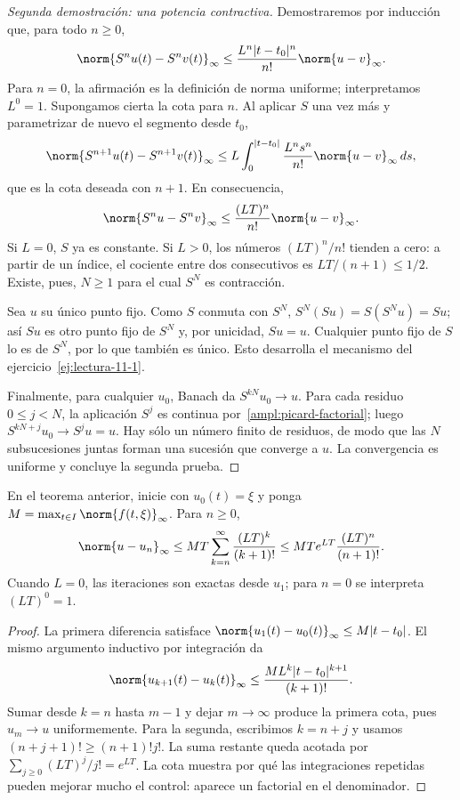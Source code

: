 \begin{proof}[Segunda demostración: una potencia contractiva]
Demostraremos por inducción que, para todo $n\ge0$,
\begin{equation}\label{ampl:picard-factorial}
 \norm{S^nu(t)-S^nv(t)}_\infty
 \le\frac{L^n|t-t_0|^n}{n!}\norm{u-v}_\infty.
\end{equation}
Para $n=0$, la afirmación es la definición de norma uniforme; interpretamos $L^0=1$. Supongamos cierta la cota para $n$. Al aplicar $S$ una vez más y parametrizar de nuevo el segmento desde $t_0$,
\[
 \norm{S^{n+1}u(t)-S^{n+1}v(t)}_\infty
 \le L\int_0^{|t-t_0|}\frac{L^ns^n}{n!}\norm{u-v}_\infty\,ds,
\]
que es la cota deseada con $n+1$. En consecuencia,
\[
 \norm{S^nu-S^nv}_\infty\le\frac{(LT)^n}{n!}\norm{u-v}_\infty.
\]
Si $L=0$, $S$ ya es constante. Si $L>0$, los números $(LT)^n/n!$ tienden a cero: a partir de un índice, el cociente entre dos consecutivos es $LT/(n+1)\le1/2$. Existe, pues, $N\ge1$ para el cual $S^N$ es contracción.

Sea $u$ su único punto fijo. Como $S$ conmuta con $S^N$,
$S^N(Su)=S(S^Nu)=Su$; así $Su$ es otro punto fijo de $S^N$ y, por unicidad, $Su=u$. Cualquier punto fijo de $S$ lo es de $S^N$, por lo que también es único. Esto desarrolla el mecanismo del ejercicio~\ref{ej:lectura-11-1}.

Finalmente, para cualquier $u_0$, Banach da $S^{kN}u_0\to u$. Para cada residuo $0\le j<N$, la aplicación $S^j$ es continua por~\eqref{ampl:picard-factorial}; luego
$S^{kN+j}u_0\to S^ju=u$. Hay sólo un número finito de residuos, de modo que las $N$ subsucesiones juntas forman una sucesión que converge a $u$. La convergencia es uniforme y concluye la segunda prueba.
\end{proof}

\begin{proposicion}\label{ampl:picard-error}
En el teorema anterior, inicie con $u_0(t)=\xi$ y ponga
$M=\max_{t\in I}\norm{f(t,\xi)}_\infty$. Para $n\ge0$,
\[
 \norm{u-u_n}_\infty
 \le MT\sum_{k=n}^{\infty}\frac{(LT)^k}{(k+1)!}
 \le MT e^{LT}\frac{(LT)^n}{(n+1)!}.
\]
Cuando $L=0$, las iteraciones son exactas desde $u_1$; para $n=0$ se interpreta $(LT)^0=1$.
\end{proposicion}
\begin{proof}
La primera diferencia satisface $\norm{u_1(t)-u_0(t)}_\infty\le M|t-t_0|$. El mismo argumento inductivo por integración da
\[
 \norm{u_{k+1}(t)-u_k(t)}_\infty
 \le\frac{ML^k|t-t_0|^{k+1}}{(k+1)!}.
\]
Sumar desde $k=n$ hasta $m-1$ y dejar $m\to\infty$ produce la primera cota, pues $u_m\to u$ uniformemente. Para la segunda, escribimos $k=n+j$ y usamos
$(n+j+1)!\ge(n+1)!j!$. La suma restante queda acotada por $\sum_{j\ge0}(LT)^j/j!=e^{LT}$. La cota muestra por qué las integraciones repetidas pueden mejorar mucho el control: aparece un factorial en el denominador.
\end{proof}

